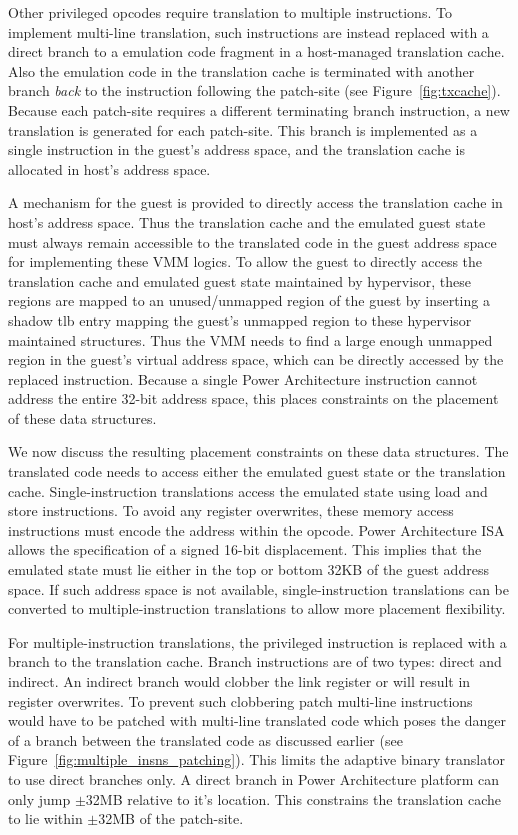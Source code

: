 Other privileged opcodes require translation to multiple instructions. To implement multi-line translation, such instructions are instead replaced with a direct branch to a emulation code fragment in a host-managed translation cache. Also the emulation code in the translation cache is terminated with another branch {\em back} to the instruction following the patch-site (see Figure~\ref{fig:txcache}). Because each patch-site requires a different terminating branch instruction, a new translation is generated for each patch-site. This branch is  implemented as a single instruction in the guest’s address space, and the translation cache is allocated in host’s address space.

A mechanism for the guest is provided to directly access the translation cache in host’s address space. Thus the translation cache and the emulated guest state must always remain accessible to the translated code in the guest address space for implementing these VMM logics. To allow the guest to directly access the translation cache and emulated guest state maintained by hypervisor, these regions are mapped to an unused/unmapped region of the guest by inserting a shadow tlb entry mapping the guest's unmapped region to these hypervisor maintained structures. Thus the VMM needs to find a large enough unmapped region in the guest’s virtual address space, which can be directly accessed by the replaced instruction. Because a single Power Architecture instruction cannot address the entire 32-bit address space, this places constraints on the placement of these data structures.

We now discuss the resulting placement constraints on these data structures. The translated code needs to access either the emulated guest state or the translation cache.  Single-instruction translations access the emulated state using load and store instructions. To avoid any register overwrites, these memory access instructions must encode the address within the opcode. Power Architecture ISA allows the specification of a signed 16-bit displacement. This implies that the emulated state must lie either in the top or bottom 32KB of the guest address space. If such address space is not available, single-instruction translations can be converted to multiple-instruction translations to allow more placement flexibility.

For multiple-instruction translations, the privileged instruction is replaced with a branch to the translation cache. Branch instructions are of two types: direct and indirect. An indirect branch would clobber the link register or will result in register overwrites. To prevent such clobbering patch multi-line instructions would have to be patched with multi-line translated code which poses the danger of a branch between the translated code as discussed earlier (see Figure~\ref{fig:multiple_insns_patching}). This limits the adaptive binary translator to use direct branches only. A direct branch in Power Architecture platform can only jump $\pm$32MB relative to it's location. This constrains the translation cache to lie within $\pm$32MB of the patch-site.

